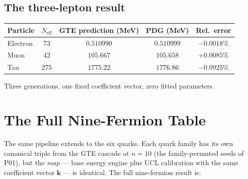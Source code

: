 \documentclass[11pt,a4paper]{article}
\newcommand{\Neff}{N_{\mathrm{eff}}}
\begin{document}
\subsection{The three-lepton result}

\begin{tcolorbox}[colback=boxorange,colframe=orange!60!black,
  title={Three Charged Lepton Masses from the GTE Cascade}]
\begin{center}
\renewcommand{\arraystretch}{1.35}
\begin{tabular}{@{}lcccc@{}}
\toprule
Particle & $\Neff$ & GTE prediction (MeV) & PDG (MeV) & Rel.\ error \\
\midrule
Electron & $73$  & $0.510990$ & $0.510999$ & $-0.0018\%$ \\
Muon     & $42$  & $105.667$  & $105.658$  & $+0.0085\%$ \\
Tau      & $275$ & $1775.22$  & $1776.86$  & $-0.0925\%$ \\
\bottomrule
\end{tabular}
\end{center}
Three generations, one fixed coefficient vector, zero fitted parameters.
\end{tcolorbox}

\section{The Full Nine-Fermion Table}
\label{sec:ninefermion}

The same pipeline extends to the six quarks.  Each quark family has its own canonical
triple from the GTE cascade at $n = 10$ (the family-permuted seeds of P01), but the
\emph{map} --- base energy engine plus UCL calibration with the same coefficient
vector $\mathbf{k}$ --- is identical.  The full nine-fermion result is:
\end{document}
